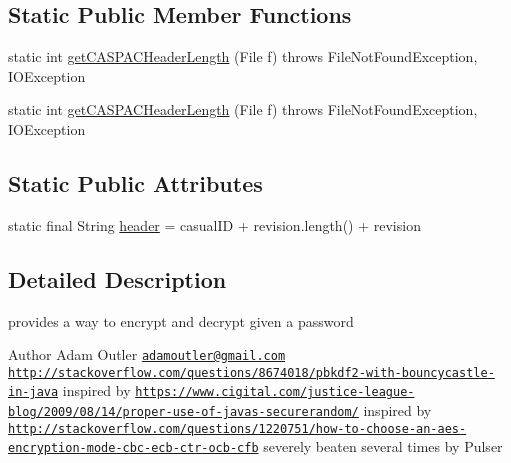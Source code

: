 \subsection*{Static Public Member Functions}
\begin{DoxyCompactItemize}
\item 
static int \hyperlink{class_c_a_s_u_a_l_1_1crypto_1_1_a_e_s128_handler_af7d875ad9b71ba6177d93b3f8d2e9b7f}{get\-C\-A\-S\-P\-A\-C\-Header\-Length} (File f)  throws File\-Not\-Found\-Exception, I\-O\-Exception 
\item 
static int \hyperlink{class_c_a_s_u_a_l_1_1crypto_1_1_a_e_s128_handler_af7d875ad9b71ba6177d93b3f8d2e9b7f}{get\-C\-A\-S\-P\-A\-C\-Header\-Length} (File f)  throws File\-Not\-Found\-Exception, I\-O\-Exception 
\end{DoxyCompactItemize}
\subsection*{Static Public Attributes}
\begin{DoxyCompactItemize}
\item 
static final String \hyperlink{class_c_a_s_u_a_l_1_1crypto_1_1_a_e_s128_handler_a3ae1cd854002227282c4e2fe7381dfbc}{header} = casual\-I\-D + revision.\-length() + revision
\end{DoxyCompactItemize}


\subsection{Detailed Description}
provides a way to encrypt and decrypt given a password

\begin{DoxyAuthor}{Author}
Adam Outler \href{mailto:adamoutler@gmail.com}{\tt adamoutler@gmail.\-com} \href{http://stackoverflow.com/questions/8674018/pbkdf2-with-bouncycastle-in-java}{\tt http\-://stackoverflow.\-com/questions/8674018/pbkdf2-\/with-\/bouncycastle-\/in-\/java} inspired by \href{https://www.cigital.com/justice-league-blog/2009/08/14/proper-use-of-javas-securerandom/}{\tt https\-://www.\-cigital.\-com/justice-\/league-\/blog/2009/08/14/proper-\/use-\/of-\/javas-\/securerandom/} inspired by \href{http://stackoverflow.com/questions/1220751/how-to-choose-an-aes-encryption-mode-cbc-ecb-ctr-ocb-cfb}{\tt http\-://stackoverflow.\-com/questions/1220751/how-\/to-\/choose-\/an-\/aes-\/encryption-\/mode-\/cbc-\/ecb-\/ctr-\/ocb-\/cfb} severely beaten several times by Pulser 
\end{DoxyAuthor}


